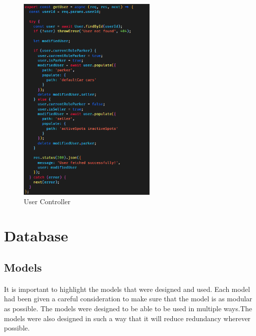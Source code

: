     \begin{figure}[h]
        \centering
        \includegraphics[width=0.6\textwidth]{images/userController.png}
        \caption{User Controller}
        \label{fig:userController}
    \end{figure}

    \pagebreak


    \section{Database}
    \subsection{Models}
    \paragraph*{}
        It is important to highlight the models that were designed and used.
        Each model had been given a careful consideration to make sure that the model is as modular as possible. The models were designed to be able to be used in multiple ways.The models were also designed in such a way that it will reduce redundancy wherever possible.\\

